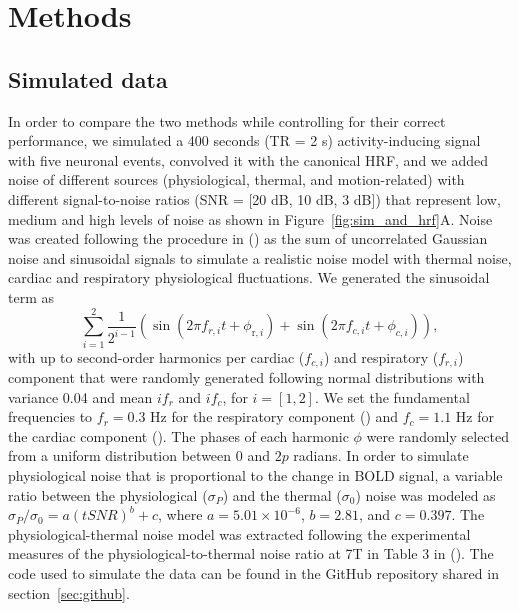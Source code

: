 
\section{Methods}
\label{sec:data}

\subsection{Simulated data}

In order to compare the two methods while controlling for their correct performance, we simulated a 400 seconds (TR = 2 s) activity-inducing signal with five neuronal events, convolved it with the canonical HRF, and we added noise of different sources (physiological, thermal, and motion-related) with different signal-to-noise ratios (SNR = [20 dB, 10 dB, 3 dB]) that represent low, medium and high levels of noise as shown in Figure~\ref{fig:sim_and_hrf}A. Noise was created following the procedure in (\citealt{Gaudes2013Paradigmfreemapping}) as the sum of uncorrelated Gaussian noise and sinusoidal signals to simulate a realistic noise model with thermal noise, cardiac and respiratory physiological fluctuations. We generated the sinusoidal term as
\begin{equation}
    \sum_{i=1}^{2} \frac{1}{2^{i-1}}\left(\sin \left(2 \pi f_{r, i} t+\phi_{\mathrm{r}, i}\right)+\sin \left(2 \pi f_{c, i} t+\phi_{c, i}\right)\right),
\end{equation}
with up to second-order harmonics per cardiac (\(f_{c,i}\)) and respiratory (\(f_{r,i}\)) component that were randomly generated following normal distributions with variance 0.04 and mean \(if_r\) and \(if_c\), for \(i = [1, 2]\). We set the fundamental frequencies to \(f_r = 0.3\) Hz for the respiratory component (\citealt{birn2006separating}) and \(f_c = 1.1\) Hz for the cardiac component (\citealt{Shmueli2007Lowfrequencyfluctuations}). The phases of each harmonic \(\phi\) were randomly selected from a uniform distribution between \(0\) and \(2p\) radians. In order to simulate physiological noise that is proportional to the change in BOLD signal, a variable ratio between the physiological (\(\sigma_P\)) and the thermal (\(\sigma_0\)) noise was modeled as \(\sigma_P/\sigma_0 = a(tSNR)^b + c\), where \(a = 5.01 \times 10^{-6}\), \(b = 2.81\), and \(c = 0.397\). The physiological-thermal noise model was extracted following the experimental measures of the physiological-to-thermal noise ratio at 7T in Table 3 in (\citealt{Triantafyllou2005Comparisonphysiologicalnoise}). The code used to simulate the data can be found in the GitHub repository shared in section~\ref{sec:github}.

